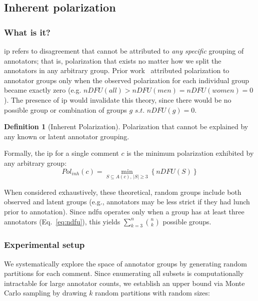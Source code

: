 \documentclass[11pt]{article}
\theoremstyle{definition}
\newtheorem{definition}{Definition}
\theoremstyle{plain}
\begin{document}
\subsection{Inherent polarization}
\label{sec:inherent:inherent}

\subsubsection{What is it?}

\acf{ip} refers to disagreement that cannot be attributed to \emph{any specific} grouping of annotators; that is, polarization that exists no matter how we split the annotators in any arbitrary group. Prior work~\cite{pavlopoulos-likas-2024} attributed polarization to annotator groups only when the observed polarization for each individual group became exactly zero (e.g. $nDFU(all) > nDFU(men)=nDFU(women) = 0$). The presence of \ac{ip} would invalidate this theory, since there would be no possible group or combination of groups $g \textit{ s.t. } nDFU(g) = 0$.

\begin{definition}[Inherent Polarization]
	\label{def:inherent}
	Polarization that cannot be explained by any known or latent annotator grouping.
\end{definition}


Formally, the \ac{ip} for a single comment $c$ is the minimum polarization exhibited by any arbitrary group:
\begin{equation}
	\label{eq:inherent}
	Pol_{inh}(c) =
	\min_{S \subseteq A(c),\, |S| \ge 3}
	\left\{
	\textit{nDFU}(S)
	\right\}
\end{equation}

When considered exhaustively, these theoretical, random groups include both observed and latent groups (e.g., annotators may be less strict if they had lunch prior to annotation). Since \ac{ndfu} operates only when a group has at least three annotators (Eq.~\ref{eq:ndfu}), this yields $\sum_{k=3}^{n} \binom{n}{k}$ possible groups.


\subsubsection{Experimental setup}
\label{sec:inherent:experimental}

We systematically explore the space of annotator groups by generating random partitions for each comment. Since enumerating all subsets is computationally intractable for large annotator counts, we establish an upper bound via Monte Carlo sampling by drawing $k$ random partitions with random sizes:
\end{document}
